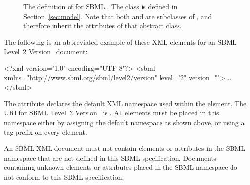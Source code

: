 \begin{figure}[htb]
  \centering
  \small
  \vspace*{-2ex}
  \caption{The definition of \Sbml for SBML \thisLV.
      The class \Model is defined in Section~\ref{sec:model}.
      Note that both \Sbml and \Model are subclasses of \SBase,
      and therefore inherit the attributes of that abstract
      class.}
  \label{fig:sbml}
\end{figure}

The following is an abbreviated example of these XML elements for
an SBML Level~2 Version~ document:

\begin{example}
<?xml version="1.0" encoding="UTF-8"?>
<sbml xmlns="http://www.sbml.org/sbml/level2/version" level="2" version="">
  ...
</sbml>
\end{example}

The attribute  declares the default XML namespace
used within the  element.  The URI for SBML Level~2 Version~
is .  All
elements must be placed in this namespace either by assigning the
default namespace as shown above, or using a tag prefix on
every element.

An SBML XML document must not contain elements or attributes in
the SBML namespace that are not defined in this SBML \thisLVR
specification.  Documents containing unknown elements or
attributes placed in the SBML namespace do not conform to this
SBML specification.

